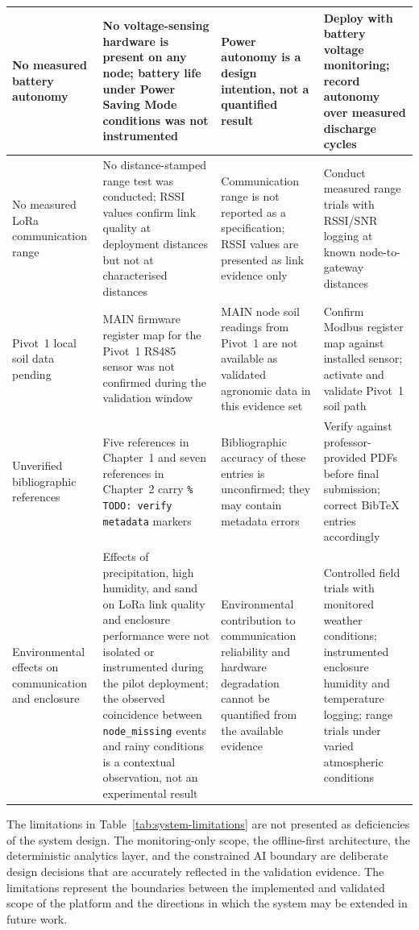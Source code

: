 \begin{table}[H]
\begin{tabular}{p{3.0cm} p{3.5cm} p{3.5cm} p{3.5cm}}
\hline
No measured battery autonomy & No voltage-sensing hardware is present on any node; battery life under Power Saving Mode conditions was not instrumented & Power autonomy is a design intention, not a quantified result & Deploy with battery voltage monitoring; record autonomy over measured discharge cycles \\
\hline
No measured LoRa communication range & No distance-stamped range test was conducted; RSSI values confirm link quality at deployment distances but not at characterised distances & Communication range is not reported as a specification; RSSI values are presented as link evidence only & Conduct measured range trials with RSSI/SNR logging at known node-to-gateway distances \\
\hline
Pivot~1 local soil data pending & MAIN firmware register map for the Pivot~1 RS485 sensor was not confirmed during the validation window & MAIN node soil readings from Pivot~1 are not available as validated agronomic data in this evidence set & Confirm Modbus register map against installed sensor; activate and validate Pivot~1 soil path \\
\hline
Unverified bibliographic references & Five references in Chapter~1 and seven references in Chapter~2 carry \texttt{\% TODO: verify metadata} markers & Bibliographic accuracy of these entries is unconfirmed; they may contain metadata errors & Verify against professor-provided PDFs before final submission; correct BibTeX entries accordingly \\
\hline
Environmental effects on communication and enclosure & Effects of precipitation, high humidity, and sand on LoRa link quality and enclosure performance were not isolated or instrumented during the pilot deployment; the observed coincidence between \texttt{node\_missing} events and rainy conditions is a contextual observation, not an experimental result & Environmental contribution to communication reliability and hardware degradation cannot be quantified from the available evidence & Controlled field trials with monitored weather conditions; instrumented enclosure humidity and temperature logging; range trials under varied atmospheric conditions \\
\hline
\end{tabular}
\end{table}

The limitations in Table~\ref{tab:system-limitations} are not presented as deficiencies of the system design. The monitoring-only scope, the offline-first architecture, the deterministic analytics layer, and the constrained AI boundary are deliberate design decisions that are accurately reflected in the validation evidence. The limitations represent the boundaries between the implemented and validated scope of the platform and the directions in which the system may be extended in future work.


